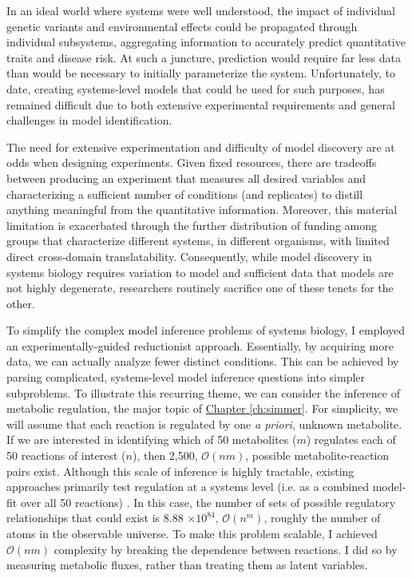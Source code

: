 In an ideal world where systems were well understood, the impact of individual genetic variants and environmental effects could be propagated through individual subsystems, aggregating information to accurately predict quantitative traits and disease risk.  At such a juncture, prediction would require far less data than would be necessary to initially parameterize the system. Unfortunately, to date, creating systems-level models that could be used for such purposes, has remained difficult due to both extensive experimental requirements and general challenges in model identification.

The need for extensive experimentation and difficulty of model discovery are at odds when designing experiments. Given fixed resources, there are tradeoffs between producing an experiment that measures all desired variables and characterizing a sufficient number of conditions (and replicates) to distill anything meaningful from the quantitative information. Moreover, this material limitation is exacerbated through the further distribution of funding among groups that characterize different systems, in different organisms, with limited direct cross-domain translatability. Consequently, while model discovery in systems biology requires variation to model and sufficient data that models are not highly degenerate, researchers routinely sacrifice one of these tenets for the other.

To simplify the complex model inference problems of systems biology, I employed an experimentally-guided reductionist approach. Essentially, by acquiring more data, we can actually analyze fewer distinct conditions. This can be achieved by parsing complicated, systems-level model inference questions into simpler subproblems. To illustrate this recurring theme, we can consider the inference of metabolic regulation, the major topic of \hyperref[ch:simmer]{Chapter \ref{ch:simmer}}. For simplicity, we will assume that each reaction is regulated by one \textit{a priori}, unknown metabolite. If we are interested in identifying which of 50 metabolites ($m$) regulates each of 50 reactions of interest ($n$), then 2,500, $\mathcal{O}(nm)$, possible metabolite-reaction pairs exist.  Although this scale of inference is highly tractable, existing approaches primarily test regulation at a systems level (i.e. as a combined model-fit over all 50 reactions) \cite{Link:2013dj, Zampar:2013fr}.  In this case, the number of sets of possible regulatory relationships that could exist is 8.88 $\times 10^{84}$, $\mathcal{O}(n^{m})$, roughly the number of atoms in the observable universe. To make this problem scalable, I achieved $\mathcal{O}(nm)$ complexity by breaking the dependence between reactions. I did so by measuring metabolic fluxes, rather than treating them as latent variables.


